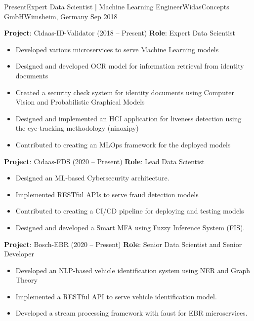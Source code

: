 %
%
%
\begin{experiences}
  \experience
  {Present}{Expert Data Scientist | Machine Learning Engineer}{WidasConcepts GmbH}{Wimsheim, Germany}
  {Sep 2018} {
  \vspace{0.1cm}
  \textbf{Project}: Cidaas-ID-Validator (2018 -- Present) \newline
   \textbf{Role}: Expert Data Scientist
    \begin{itemize}
      \item Developed various microservices to serve Machine Learning models
      \item Designed and developed OCR model for information retrieval from identity documents
      \item Created a security check system for identity documents using Computer Vision and Probabilistic Graphical Models
      \item Designed and implemented an HCI application for liveness detection using the eye-tracking methodology (ninoxipy)
      \item Contributed to creating an MLOps framework for the deployed models 
    \end{itemize}
      \vspace{0.1cm}
    \textbf{Project}: Cidaas-FDS (2020 -- Present)\newline
    \textbf{Role}: Lead Data Scientist
        \begin{itemize}
          \item Designed an ML-based Cybersecurity architecture. 
          \item Implemented RESTful APIs to serve fraud detection models
          \item Contributed to creating a CI/CD pipeline for deploying and testing models
          \item Designed and developed a Smart MFA using Fuzzy Inference System (FIS).
        \end{itemize}
          \vspace{0.1cm}

    \textbf{Project}: Bosch-EBR (2020 -- Present)\newline
    \textbf{Role}: Senior Data Scientist and Senior Developer
        \begin{itemize}
          \item Developed an NLP-based vehicle identification system using NER and Graph Theory
          \item Implemented a RESTful API to serve vehicle identification model.
          \item Developed a stream processing framework with faust for EBR microservices.
        \end{itemize}
       \vspace{0.1cm}

}
\end{experiences}
